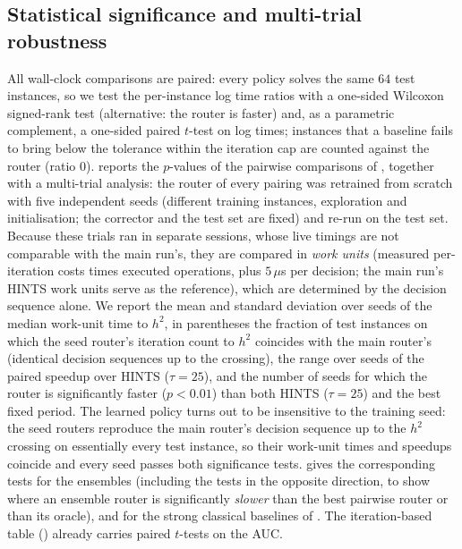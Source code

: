\subsection{Statistical significance and multi-trial robustness}
\label{sec:wallclock_stats}

All wall-clock comparisons are paired: every policy solves the same $64$ test instances, so we test the per-instance log time ratios with a one-sided Wilcoxon signed-rank test (alternative: the router is faster) and, as a parametric complement, a one-sided paired $t$-test on log times; instances that a baseline fails to bring below the tolerance within the iteration cap are counted against the router (ratio $0$).  reports the $p$-values of the pairwise comparisons of , together with a multi-trial analysis: the router of every pairing was retrained from scratch with five independent seeds (different training instances, exploration and initialisation; the corrector and the test set are fixed) and re-run on the test set. Because these trials ran in separate sessions, whose live timings are not comparable with the main run's, they are compared in \emph{work units} (measured per-iteration costs times executed operations, plus $5\,\mu$s per decision; the main run's HINTS work units serve as the reference), which are determined by the decision sequence alone. We report the mean and standard deviation over seeds of the median work-unit time to $h^2$, in parentheses the fraction of test instances on which the seed router's iteration count to $h^2$ coincides with the main router's (identical decision sequences up to the crossing), the range over seeds of the paired speedup over HINTS ($\tau{=}25$), and the number of seeds for which the router is significantly faster ($p<0.01$) than both HINTS ($\tau{=}25$) and the best fixed period. The learned policy turns out to be insensitive to the training seed: the seed routers reproduce the main router's decision sequence up to the $h^2$ crossing on essentially every test instance, so their work-unit times and speedups coincide and every seed passes both significance tests.  gives the corresponding tests for the ensembles (including the tests in the opposite direction, to show where an ensemble router is significantly \emph{slower} than the best pairwise router or than its oracle), and  for the strong classical baselines of . The iteration-based table () already carries paired $t$-tests on the AUC.

